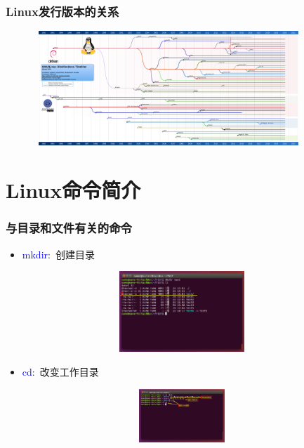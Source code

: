 \frame
{
	\frametitle{\textrm{Linux}发行版本的关系}
\begin{figure}[h!]
\centering
\vspace{21.5pt}
\includegraphics[height=1.7in,width=4.0in,viewport=0 0 2400 1080,clip]{Figures/Linux_distro-timeline.png}
\label{Linux-distri-timeline}
\end{figure}
}

\section{\rm{Linux}命令简介}
\frame
{
	\frametitle{与目录和文件有关的命令}
	\begin{itemize}
\setlength{\itemsep}{-10pt}
		\item \textcolor{blue}{mkdir}:~创建目录
\begin{figure}[h!]
\centering
\vspace{-11.5pt}
\includegraphics[height=1.2in,width=3.9in,viewport=0 220 800 470,clip]{Figures/Ubuntu-mkdir.png}
\label{Linux-command-mkdir}
\end{figure}
		\item \textcolor{blue}{cd}:~改变工作目录
\begin{figure}[h!]
\centering
\vspace{-9.5pt}
\includegraphics[height=0.8in,width=3.9in,viewport=0 310 800 470,clip]{Figures/Ubuntu-cd.png}
\label{Linux-command-cd}
\end{figure}
	\end{itemize}
}

